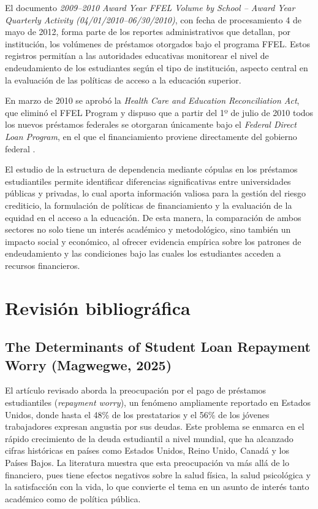 \documentclass[11pt,a4paper]{article}
\begin{document}
El documento \textit{2009--2010 Award Year FFEL Volume by School – Award Year Quarterly Activity (04/01/2010--06/30/2010)}, con fecha de procesamiento 4 de mayo de 2012, forma parte de los reportes administrativos que detallan, por institución, los volúmenes de préstamos otorgados bajo el programa FFEL. Estos registros permitían a las autoridades educativas monitorear el nivel de endeudamiento de los estudiantes según el tipo de institución, aspecto central en la evaluación de las políticas de acceso a la educación superior.

En marzo de 2010 se aprobó la \textit{Health Care and Education Reconciliation Act}, que eliminó el FFEL Program y dispuso que a partir del 1º de julio de 2010 todos los nuevos préstamos federales se otorgaran únicamente bajo el \textit{Federal Direct Loan Program}, en el que el financiamiento proviene directamente del gobierno federal \parencite{usdoe2010,usdoe2012}.

El estudio de la estructura de dependencia mediante cópulas en los préstamos estudiantiles permite identificar diferencias significativas entre universidades públicas y privadas, lo cual aporta información valiosa para la gestión del riesgo crediticio, la formulación de políticas de financiamiento y la evaluación de la equidad en el acceso a la educación. De esta manera, la comparación de ambos sectores no solo tiene un interés académico y metodológico, sino también un impacto social y económico, al ofrecer evidencia empírica sobre los patrones de endeudamiento y las condiciones bajo las cuales los estudiantes acceden a recursos financieros.

\section{Revisión bibliográfica}


\subsection{The Determinants of Student Loan Repayment Worry (Magwegwe, 2025)}

El artículo revisado aborda la preocupación por el pago de préstamos estudiantiles (\textit{repayment worry}), un fenómeno ampliamente reportado en Estados Unidos, donde hasta el 48\% de los prestatarios y el 56\% de los jóvenes trabajadores expresan angustia por sus deudas. Este problema se enmarca en el rápido crecimiento de la deuda estudiantil a nivel mundial, que ha alcanzado cifras históricas en países como Estados Unidos, Reino Unido, Canadá y los Países Bajos. La literatura muestra que esta preocupación va más allá de lo financiero, pues tiene efectos negativos sobre la salud física, la salud psicológica y la satisfacción con la vida, lo que convierte el tema en un asunto de interés tanto académico como de política pública.
\end{document}
